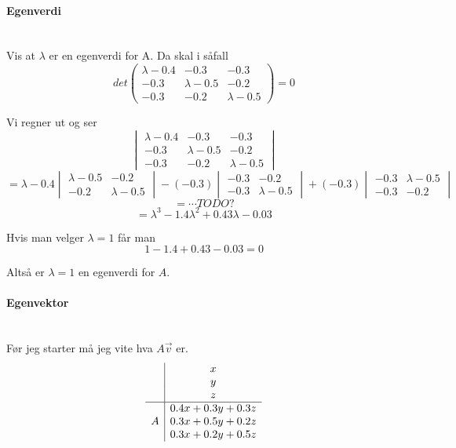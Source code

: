 \paragraph{Egenverdi} \mbox{} \\
Vis at $\lambda$ er en egenverdi for A.
Da skal i såfall
$$det\begin{pmatrix}
     \lambda - 0.4 & -0.3 & -0.3 \\
     -0.3 & \lambda - 0.5 & -0.2 \\
     -0.3 & -0.2 & \lambda - 0.5
     \end{pmatrix} = 0$$

Vi regner ut og ser
$$\begin{vmatrix}
  \lambda - 0.4 & -0.3 & -0.3 \\
  -0.3 & \lambda - 0.5 & -0.2 \\
  -0.3 & -0.2 & \lambda - 0.5
  \end{vmatrix}$$
$$= \lambda - 0.4 \begin{vmatrix}
                  \lambda - 0.5 & -0.2 \\
                  -0.2 & \lambda - 0.5
                  \end{vmatrix}
    -(-0.3)\begin{vmatrix}
           -0.3 & -0.2 \\
           -0.3 & \lambda - 0.5
           \end{vmatrix}
    +(-0.3)\begin{vmatrix}
           -0.3 & \lambda - 0.5 \\
           -0.3 & - 0.2
           \end{vmatrix} $$
$$= \cdots TODO?$$
$$= \lambda^3 - 1.4\lambda^2 + 0.43\lambda - 0.03$$

Hvis man velger $\lambda = 1$ får man
$$1 - 1.4 + 0.43 - 0.03 = 0$$

Altså er $\lambda = 1$ en egenverdi for $A$.



\paragraph{Egenvektor} \mbox{} \\
Før jeg starter må jeg vite hva $A\vec{v}$ er.
$$\begin{array}{c|c}
    & x \\
    & y \\
    & z \\
  \hline
    & 0.4x + 0.3y + 0.3z \\
  A & 0.3x + 0.5y + 0.2z \\
    & 0.3x + 0.2y + 0.5z
  \end{array}$$

